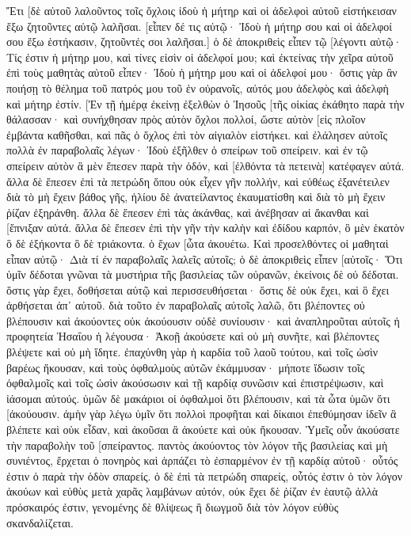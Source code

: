Ἔτι [δὲ αὐτοῦ λαλοῦντος τοῖς ὄχλοις ἰδοὺ ἡ μήτηρ καὶ οἱ ἀδελφοὶ αὐτοῦ εἱστήκεισαν ἔξω ζητοῦντες αὐτῷ λαλῆσαι. 
[εἶπεν δέ τις αὐτῷ· Ἰδοὺ ἡ μήτηρ σου καὶ οἱ ἀδελφοί σου ἔξω ἑστήκασιν, ζητοῦντές σοι λαλῆσαι.] 
ὁ δὲ ἀποκριθεὶς εἶπεν τῷ [λέγοντι αὐτῷ· Τίς ἐστιν ἡ μήτηρ μου, καὶ τίνες εἰσὶν οἱ ἀδελφοί μου; 
καὶ ἐκτείνας τὴν χεῖρα αὐτοῦ ἐπὶ τοὺς μαθητὰς αὐτοῦ εἶπεν· Ἰδοὺ ἡ μήτηρ μου καὶ οἱ ἀδελφοί μου· 
ὅστις γὰρ ἂν ποιήσῃ τὸ θέλημα τοῦ πατρός μου τοῦ ἐν οὐρανοῖς, αὐτός μου ἀδελφὸς καὶ ἀδελφὴ καὶ μήτηρ ἐστίν. 
[Ἐν τῇ ἡμέρᾳ ἐκείνῃ ἐξελθὼν ὁ Ἰησοῦς [τῆς οἰκίας ἐκάθητο παρὰ τὴν θάλασσαν· 
καὶ συνήχθησαν πρὸς αὐτὸν ὄχλοι πολλοί, ὥστε αὐτὸν [εἰς πλοῖον ἐμβάντα καθῆσθαι, καὶ πᾶς ὁ ὄχλος ἐπὶ τὸν αἰγιαλὸν εἱστήκει. 
καὶ ἐλάλησεν αὐτοῖς πολλὰ ἐν παραβολαῖς λέγων· Ἰδοὺ ἐξῆλθεν ὁ σπείρων τοῦ σπείρειν. 
καὶ ἐν τῷ σπείρειν αὐτὸν ἃ μὲν ἔπεσεν παρὰ τὴν ὁδόν, καὶ [ἐλθόντα τὰ πετεινὰ] κατέφαγεν αὐτά. 
ἄλλα δὲ ἔπεσεν ἐπὶ τὰ πετρώδη ὅπου οὐκ εἶχεν γῆν πολλήν, καὶ εὐθέως ἐξανέτειλεν διὰ τὸ μὴ ἔχειν βάθος γῆς, 
ἡλίου δὲ ἀνατείλαντος ἐκαυματίσθη καὶ διὰ τὸ μὴ ἔχειν ῥίζαν ἐξηράνθη. 
ἄλλα δὲ ἔπεσεν ἐπὶ τὰς ἀκάνθας, καὶ ἀνέβησαν αἱ ἄκανθαι καὶ [ἔπνιξαν αὐτά. 
ἄλλα δὲ ἔπεσεν ἐπὶ τὴν γῆν τὴν καλὴν καὶ ἐδίδου καρπόν, ὃ μὲν ἑκατὸν ὃ δὲ ἑξήκοντα ὃ δὲ τριάκοντα. 
ὁ ἔχων [ὦτα ἀκουέτω. 
Καὶ προσελθόντες οἱ μαθηταὶ εἶπαν αὐτῷ· Διὰ τί ἐν παραβολαῖς λαλεῖς αὐτοῖς; 
ὁ δὲ ἀποκριθεὶς εἶπεν [αὐτοῖς· Ὅτι ὑμῖν δέδοται γνῶναι τὰ μυστήρια τῆς βασιλείας τῶν οὐρανῶν, ἐκείνοις δὲ οὐ δέδοται. 
ὅστις γὰρ ἔχει, δοθήσεται αὐτῷ καὶ περισσευθήσεται· ὅστις δὲ οὐκ ἔχει, καὶ ὃ ἔχει ἀρθήσεται ἀπ᾽ αὐτοῦ. 
διὰ τοῦτο ἐν παραβολαῖς αὐτοῖς λαλῶ, ὅτι βλέποντες οὐ βλέπουσιν καὶ ἀκούοντες οὐκ ἀκούουσιν οὐδὲ συνίουσιν· 
καὶ ἀναπληροῦται αὐτοῖς ἡ προφητεία Ἠσαΐου ἡ λέγουσα· Ἀκοῇ ἀκούσετε καὶ οὐ μὴ συνῆτε, καὶ βλέποντες βλέψετε καὶ οὐ μὴ ἴδητε. 
ἐπαχύνθη γὰρ ἡ καρδία τοῦ λαοῦ τούτου, καὶ τοῖς ὠσὶν βαρέως ἤκουσαν, καὶ τοὺς ὀφθαλμοὺς αὐτῶν ἐκάμμυσαν· μήποτε ἴδωσιν τοῖς ὀφθαλμοῖς καὶ τοῖς ὠσὶν ἀκούσωσιν καὶ τῇ καρδίᾳ συνῶσιν καὶ ἐπιστρέψωσιν, καὶ ἰάσομαι αὐτούς. 
ὑμῶν δὲ μακάριοι οἱ ὀφθαλμοὶ ὅτι βλέπουσιν, καὶ τὰ ὦτα ὑμῶν ὅτι [ἀκούουσιν. 
ἀμὴν γὰρ λέγω ὑμῖν ὅτι πολλοὶ προφῆται καὶ δίκαιοι ἐπεθύμησαν ἰδεῖν ἃ βλέπετε καὶ οὐκ εἶδαν, καὶ ἀκοῦσαι ἃ ἀκούετε καὶ οὐκ ἤκουσαν. 
Ὑμεῖς οὖν ἀκούσατε τὴν παραβολὴν τοῦ [σπείραντος. 
παντὸς ἀκούοντος τὸν λόγον τῆς βασιλείας καὶ μὴ συνιέντος, ἔρχεται ὁ πονηρὸς καὶ ἁρπάζει τὸ ἐσπαρμένον ἐν τῇ καρδίᾳ αὐτοῦ· οὗτός ἐστιν ὁ παρὰ τὴν ὁδὸν σπαρείς. 
ὁ δὲ ἐπὶ τὰ πετρώδη σπαρείς, οὗτός ἐστιν ὁ τὸν λόγον ἀκούων καὶ εὐθὺς μετὰ χαρᾶς λαμβάνων αὐτόν, 
οὐκ ἔχει δὲ ῥίζαν ἐν ἑαυτῷ ἀλλὰ πρόσκαιρός ἐστιν, γενομένης δὲ θλίψεως ἢ διωγμοῦ διὰ τὸν λόγον εὐθὺς σκανδαλίζεται. 
